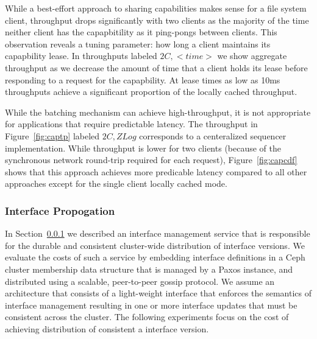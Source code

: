 \documentclass[10pt,twocolumn]{article}
\begin{document}
While a best-effort approach to sharing capabilities makes sense for a file
system client, throughput drops significantly with two clients as the majority
of the time neither client has the capapbitility as it ping-pongs between
clients. This observation reveals a tuning parameter: how long a client
maintains its capapbility lease. In throughputs labeled $2C,<time>$ we show
aggregate throughput as we decrease the amount of time that a client holds its
lease before responding to a request for the capapbility.  At lease times as
low as 10ms throughputs achieve a significant proportion of the locally cached
throughput.

While the batching mechanism can achieve high-throughput, it is not appropriate
for applications that require predictable latency. The throughput in
Figure~\ref{fig:captp} labeled $2C,ZLog$ corresponds to a centeralized
sequencer implementation. While throughput is lower for two clients (because of
the synchronous network round-trip required for each request),
Figure~\ref{fig:capcdf} shows that this approach achieves more predicable
latency compared to all other approaches except for the single client locally
cached mode.

\subsubsection{Interface Propogation}

In Section~\ref{} we described an interface management service that is
responsible for the durable and consistent cluster-wide distribution of
interface versions. We evaluate the costs of such a service by embedding
interface definitions in a Ceph cluster membership data structure that is
managed by a Paxos instance, and distributed using a scalable, peer-to-peer
gossip protocol. We assume an architecture that consists of a light-weight
interface that enforces the semantics of interface management resulting in one
or more interface updates that must be consistent across the cluster. The
following experiments focus on the cost of achieving distribution of consistent
a interface version.
\end{document}
